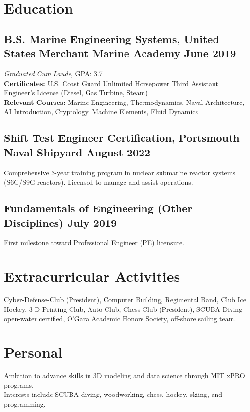 \documentclass[10pt,a4paper]{article}
\begin{document}
\section*{Education}

\subsection{B.S. Marine Engineering Systems, United States Merchant Marine Academy \hfill June 2019}
\textit{Graduated Cum Laude}, GPA: 3.7 \\
\textbf{Certificates:} U.S. Coast Guard Unlimited Horsepower Third Assistant Engineer’s License (Diesel, Gas Turbine, Steam) \\
\textbf{Relevant Courses:} Marine Engineering, Thermodynamics, Naval Architecture, AI Introduction, Cryptology, Machine Elements, Fluid Dynamics\\

\subsection{Shift Test Engineer Certification, Portsmouth Naval Shipyard \hfill August 2022}
Comprehensive 3-year training program in nuclear submarine reactor systems (S6G/S9G reactors). Licensed to manage and assist operations.\\

\subsection{Fundamentals of Engineering (Other Disciplines) \hfill July 2019}
First milestone toward Professional Engineer (PE) licensure.


\section*{Extracurricular Activities}
Cyber-Defense-Club (President), Computer Building, Regimental Band, Club Ice Hockey, 3-D Printing Club, Auto Club, Chess Club (President), SCUBA Diving open-water certified, O’Gara Academic Honors Society, off-shore sailing team.

\section*{Personal}
Ambition to advance skills in 3D modeling and data science through MIT xPRO programs. \\
Interests include SCUBA diving, woodworking, chess, hockey, skiing, and programming.
\end{document}
